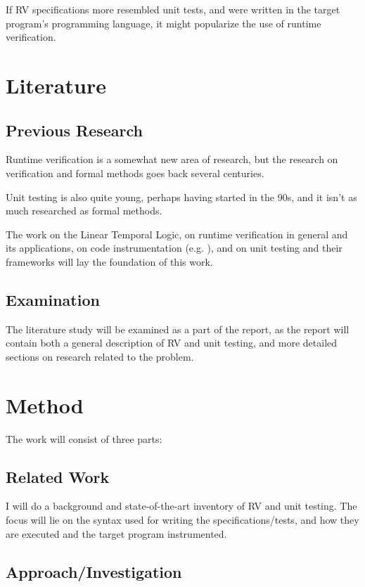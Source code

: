\documentclass[a4paper,11pt]{article}
\begin{document}
If RV specifications more resembled unit tests, and were written in the target program's
programming language, it might popularize the use of runtime verification.


\section{Literature}

\subsection{Previous Research}

Runtime verification is a somewhat new area of research, but the research on verification and formal methods goes back several centuries.

Unit testing is also quite young, perhaps having started in the 90s, and it isn't as much researched as formal methods.

The work on the Linear Temporal Logic, on runtime verification in general and its applications, on code instrumentation (e.g. \cite{aspectj,matusiak09}), and on unit testing and their frameworks will lay the foundation of this work.


\subsection{Examination}

The literature study will be examined as a part of the report, as the report will contain
both a general description of RV and unit testing, and more detailed sections on research related to the problem.


\section{Method}

The work will consist of three parts:


\subsection{Related Work}

I will do a background and state-of-the-art inventory of RV and unit testing. The focus will lie on the syntax used for writing the specifications/tests, and how they are executed and the target program instrumented.



\subsection{Approach/Investigation}
\end{document}

